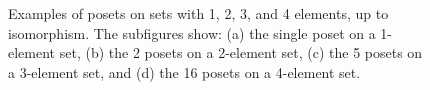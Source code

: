 {\begin{figure}[h]
    \caption{Examples of posets on sets with 1, 2, 3, and 4 elements, up to isomorphism.
        The subfigures show: (a) the single poset on a 1-element set, (b) the 2 posets on a 2-element set, (c) the 5 posets on a 3-element set, and (d) the 16 posets on a 4-element set.
    }
    \label{fig:posets-up-to-four}
\end{figure}

}
